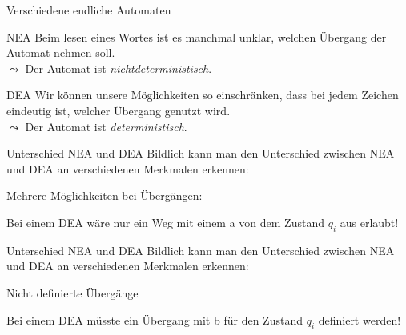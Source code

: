 \begin{frame}[fragile]{Verschiedene endliche Automaten}
    \begin{alertblock}{NEA}
        Beim lesen eines Wortes ist es manchmal unklar, welchen Übergang der Automat nehmen soll.\\
        $\leadsto$ Der Automat ist \emph{\alert{nichtdeterministisch}}.
    \end{alertblock}
    \begin{alertblock}{DEA}
        Wir können unsere Möglichkeiten so einschränken, dass bei jedem Zeichen eindeutig ist, welcher Übergang genutzt wird.\\
        $\leadsto$ Der Automat ist \alert{\emph{deterministisch}}.
    \end{alertblock}
\end{frame}

\begin{frame}[fragile]{Unterschied NEA und DEA}
    Bildlich kann man den Unterschied zwischen NEA und DEA an verschiedenen Merkmalen erkennen:
    \begin{alertblock}{Mehrere Möglichkeiten bei Übergängen:}
        \begin{center}
        \end{center}
        Bei einem DEA wäre nur ein Weg mit einem \alert{a} von dem Zustand $q_i$ aus erlaubt!
    \end{alertblock}
\end{frame}

\begin{frame}[fragile]{Unterschied NEA und DEA}
    Bildlich kann man den Unterschied zwischen NEA und DEA an verschiedenen Merkmalen erkennen:
    \begin{alertblock}{Nicht definierte Übergänge}
        \begin{center}
        \end{center}
        Bei einem DEA müsste ein Übergang mit \alert{b} für den Zustand $q_i$ definiert werden!
    \end{alertblock}
\end{frame}

